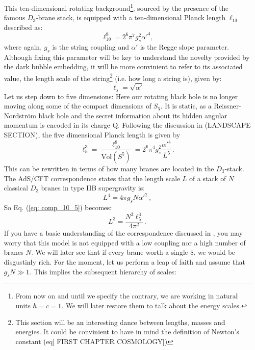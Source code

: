 This ten-dimensional rotating background\footnote{From now on and until we specify the contrary, we are working in natural units $\hbar =c=1$. We will later restore them to talk about the energy scales.}, sourced by the presence of the famous $D_{3}$-brane stack, is equipped with a ten-dimensional Planck length $\ell_{10}$ described as:
\begin{equation}\label{eq: l10_and_ls}
    \ell_{10}^8  = 2^{6} \pi^{7} g_s^2 \alpha'^{4},
\end{equation}
where again, $g_{s}$ is the string coupling and $\alpha'$ is the Regge slope parameter. Although fixing this parameter will be key to understand the novelty provided by the dark bubble embedding, it will be more convinient to refer to its associated value, the length scale of the string\footnote{This section will be an interesting dance between lengths, masses and energies. It could be convinient to have in mind the definition of Newton's constant (eq[ FIRST CHAPTER COSMOLOGY])} (i.e. how long a string is), given by:
\begin{equation}
    \ell_{s} = \sqrt{\alpha'}
\end{equation}
Let us step down to five dimensions: Here our rotating black hole is no longer moving along some of the compact dimensions of $S_{5}$. It is static, as a Reissner-Nordström black hole and the secret information about its hidden angular momentum is encoded in its charge Q. Following the discussion in (LANDSCAPE SECTION), the five dimensional Planck length is given by
\begin{equation}\label{eq: comp_10_5}
    \ell_5^3 = \frac{\ell_{10}^{8}}{\text{Vol}(S^{5})} = 2^{6} \pi^{4} g_{s}^{2} \frac{\alpha'^{4}}{L^{5}} \,.
\end{equation}
This can be rewritten in terms of how many branes are located in the $D_{3}$-stack. The AdS/CFT correspondence \cite{Maldacena:1998aa} states that the length scale $L$ of a stack of $N$ classical $D_3$ branes in type IIB supergravity is: 
\begin{equation}\label{eq: AdS_correspondence}
    L^4 = 4 \pi g_s N \alpha'^{2} \,,
\end{equation}
So  Eq. (\ref{eq: comp_10_5}) becomes:
\begin{equation}\label{eq: G5_and_L}
    L^3 = \frac{N^{2} \ell_{5}^{3}}{4 \pi^{2}} \, .
\end{equation}
If you have a basic understanding of the correspondence discussed in \cite{Maldacena:1998aa}, you may worry that this model is not equipped with a low coupling nor a high number of branes $N$. We will later see that if every brane worth a single $\$$, we would be disgustinly rich. For the moment, let us perform a leap of faith and assume that $g_{s} N \gg 1$. This implies the subsequent hierarchy of scales:
